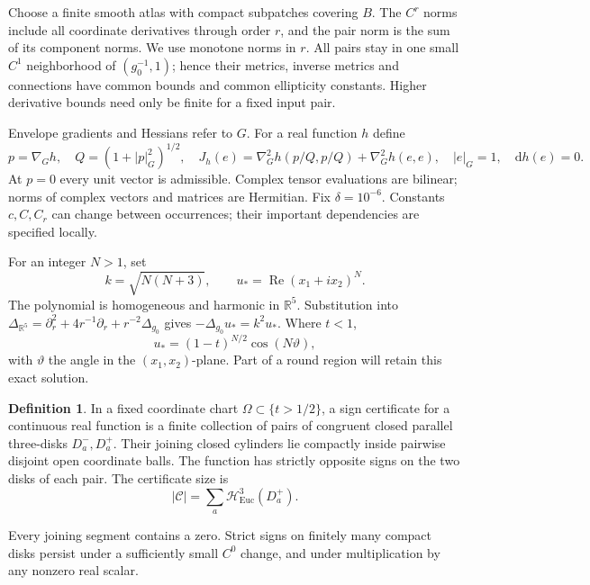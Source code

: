 \documentclass[11pt]{article}
\newcommand{\R}{\mathbb R}
\newcommand{\dd}{\mathrm d}
\newcommand{\HH}{\mathcal H}
\theoremstyle{definition}
\newtheorem{definition}[theorem]{Definition}
\theoremstyle{remark}
\numberwithin{equation}{section}
\begin{document}
Choose a finite smooth atlas with compact subpatches covering \(B\).
The \(C^r\) norms include all coordinate derivatives through order \(r\),
and the pair norm is the sum of its component norms. We use monotone
norms in \(r\). All pairs stay in one small \(C^1\) neighborhood of
\((g_0^{-1},1)\); hence their metrics, inverse metrics and connections
have common bounds and common ellipticity constants. Higher derivative
bounds need only be finite for a fixed input pair.

Envelope gradients and Hessians refer to \(G\). For a real function \(h\)
define
\begin{equation}\label{eq:test}
 p=\nabla_G h,\quad Q=(1+|p|_G^2)^{1/2},\quad
 J_h(e)=\nabla_G^2h(p/Q,p/Q)+\nabla_G^2h(e,e),
 \quad |e|_G=1,\quad \dd h(e)=0.
\end{equation}
At \(p=0\) every unit vector is admissible. Complex tensor evaluations
are bilinear; norms of complex vectors and matrices are Hermitian.
Fix \(\delta=10^{-6}\). Constants \(c,C,C_r\) can change between
occurrences; their important dependencies are specified locally.

For an integer \(N>1\), set
\begin{equation}\label{eq:beam}
 k=\sqrt{N(N+3)},\qquad u_*=\operatorname{Re}(x_1+i x_2)^N.
\end{equation}
The polynomial is homogeneous and harmonic in \(\R^5\). Substitution
into
\(\Delta_{\R^5}=\partial_r^2+4r^{-1}\partial_r+r^{-2}\Delta_{g_0}\)
gives \(-\Delta_{g_0}u_*=k^2u_*\). Where \(t<1\),
\[
 u_*=(1-t)^{N/2}\cos(N\vartheta),
\]
with \(\vartheta\) the angle in the \((x_1,x_2)\)-plane.
Part of a round region will retain this exact solution.

\begin{definition}\label{def:sign}
In a fixed coordinate chart \(\Omega\subset\{t>1/2\}\), a sign
certificate for a continuous real function is a finite collection of
pairs of congruent closed parallel three-disks \(D_a^-,D_a^+\).
Their joining closed cylinders lie compactly inside pairwise disjoint
open coordinate balls. The function has strictly opposite signs on the
two disks of each pair. The certificate size is
\[
 |\mathcal C|=\sum_a\HH_{\mathrm{Euc}}^3(D_a^+).
\]
\end{definition}

Every joining segment contains a zero. Strict signs on finitely many
compact disks persist under a sufficiently small \(C^0\) change, and
under multiplication by any nonzero real scalar.
\end{document}
